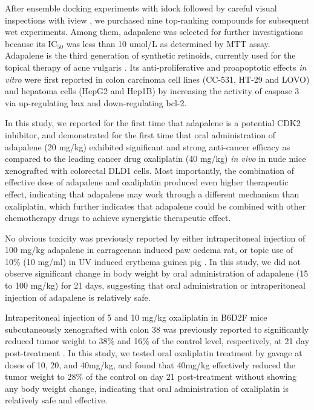 After ensemble docking experiments with idock \citep{1153,1362} followed by careful visual inspections with iview \citep{1366}, we purchased nine top-ranking compounds for subsequent wet experiments. Among them, adapalene was selected for further investigations because its IC$_{50}$ was less than 10 umol/L as determined by MTT assay. Adapalene is the third generation of synthetic retinoids, currently used for the topical therapy of acne vulgaris \citep{1599}. Its anti-proliferative and proapoptotic effects \textit{in vitro} were first reported in colon carcinoma cell lines (CC-531, HT-29 and LOVO) \citep{1600} and hepatoma cells (HepG2 and Hep1B) \citep{1601} by increasing the activity of caspase 3 via up-regulating bax and down-regulating bcl-2.

In this study, we reported for the first time that adapalene is a potential CDK2 inhibitor, and demonstrated for the first time that oral administration of adapalene (20 mg/kg) exhibited significant and strong anti-cancer efficacy as compared to the leading cancer drug oxaliplatin (40 mg/kg) \textit{in vivo} in nude mice xenografted with colorectal DLD1 cells. Most importantly, the combination of effective dose of adapalene and oxaliplatin produced even higher therapeutic effect, indicating that adapalene may work through a different mechanism than oxaliplatin, which further indicates that adapalene could be combined with other chemotherapy drugs to achieve synergistic therapeutic effect.

No obvious toxicity was previously reported by either intraperitoneal injection of 100 mg/kg adapalene in carrageenan induced paw oedema rat, or topic use of 10\% (10 mg/ml) in UV induced erythema guinea pig \citep{1604}. In this study, we did not observe significant change in body weight by oral administration of adapalene (15 to 100 mg/kg) for 21 days, suggesting that oral administration or intraperitoneal injection of adapalene is relatively safe.

Intraperitoneal injection of 5 and 10 mg/kg oxaliplatin in B6D2F mice subcutaneously xenografted with colon 38 was previously reported to significantly reduced tumor weight to 38\% and 16\% of the control level, respectively, at 21 day post-treatment \citep{1605}. In this study, we tested oral oxaliplatin treatment by gavage at doses of 10, 20, and 40mg/kg, and found that 40mg/kg effectively reduced the tumor weight to 28\% of the control on day 21 post-treatment without showing any body weight change, indicating that oral administration of oxaliplatin is relatively safe and effective.

